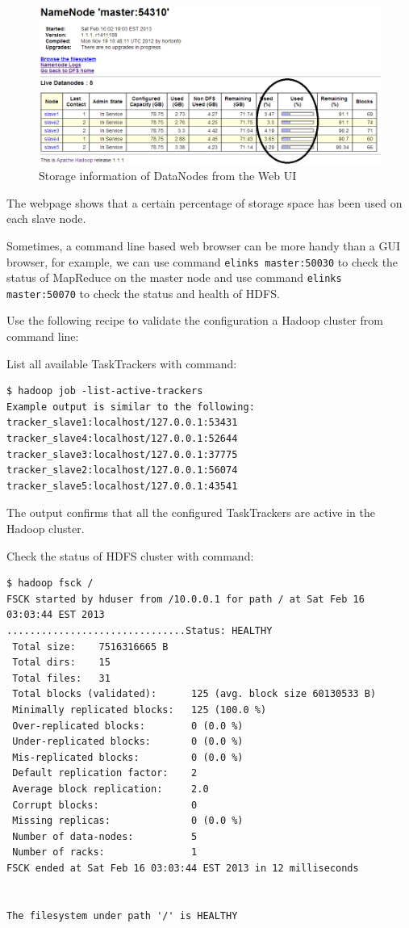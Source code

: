 \begin{figure}[h]
  \centering
  \includegraphics[width=.8\textwidth]{figs/5163os_03_07.png}
  \caption{Storage information of DataNodes from the Web UI}\label{fig:hdfs.storage}
\end{figure} 


The webpage shows that a certain percentage of storage space has been used on each slave node.

Sometimes, a command line based web browser can be more handy than a GUI browser, for example, we can use command \verb|elinks master:50030| to check the status of MapReduce on the master node and use command \verb|elinks master:50070| to check the status and health of HDFS.

Use the following recipe to validate the configuration a Hadoop cluster from command line:

List all available TaskTrackers with command:
\lstset{style=bashstyle}
\begin{lstlisting}[caption=Displaying all active trackers in the MapReduce cluster]
$ hadoop job -list-active-trackers
Example output is similar to the following:
tracker_slave1:localhost/127.0.0.1:53431
tracker_slave4:localhost/127.0.0.1:52644
tracker_slave3:localhost/127.0.0.1:37775
tracker_slave2:localhost/127.0.0.1:56074
tracker_slave5:localhost/127.0.0.1:43541
\end{lstlisting}

The output confirms that all the configured TaskTrackers are active in the Hadoop cluster.

Check the status of HDFS cluster with command:
\lstset{style=bashstyle}
\begin{lstlisting}[caption=Checking the status of the HDFS cluster.]
$ hadoop fsck /
FSCK started by hduser from /10.0.0.1 for path / at Sat Feb 16 03:03:44 EST 2013
...............................Status: HEALTHY
 Total size:    7516316665 B
 Total dirs:    15
 Total files:   31
 Total blocks (validated):      125 (avg. block size 60130533 B)
 Minimally replicated blocks:   125 (100.0 %)
 Over-replicated blocks:        0 (0.0 %)
 Under-replicated blocks:       0 (0.0 %)
 Mis-replicated blocks:         0 (0.0 %)
 Default replication factor:    2
 Average block replication:     2.0
 Corrupt blocks:                0
 Missing replicas:              0 (0.0 %)
 Number of data-nodes:          5
 Number of racks:               1
FSCK ended at Sat Feb 16 03:03:44 EST 2013 in 12 milliseconds


The filesystem under path '/' is HEALTHY
\end{lstlisting}

